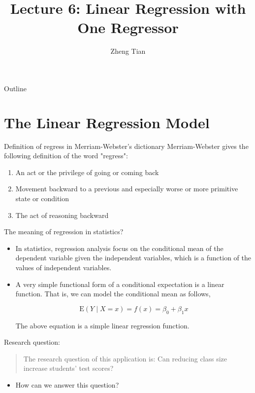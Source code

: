 \documentclass[presentation]{beamer}
\author{Zheng Tian}
\date{}
\title{Lecture 6: Linear Regression with One Regressor}
\begin{document}
\maketitle
\begin{frame}{Outline}
\setcounter{tocdepth}{1}
\tableofcontents
\end{frame}


\section{The Linear Regression Model}
\label{sec:org80d75fe}

\begin{frame}[label={sec:org3532a4e}]{Definition of \alert{regress} in Merriam-Webster's dictionary}
Merriam-Webster gives the following definition of the word "regress":
\begin{enumerate}
\item An act or the privilege of going or coming back
\item Movement backward to a previous and especially worse or more
primitive state or condition
\item The act of reasoning backward
\end{enumerate}
\end{frame}

\begin{frame}[label={sec:org1b079e3}]{The meaning of regression in statistics?}
\begin{itemize}
\item In statistics, regression analysis focus on the conditional mean of the
dependent variable given the independent variables, which is a
function of the values of independent variables.

\item A very simple functional form of a conditional expectation is a linear
function. That is, we can model the conditional mean as follows,

\begin{equation}
\label{eq:genpopreg}
\mathrm{E}(Y \mid X = x) = f(x) = \beta_{0} + \beta_1 x
\end{equation}

The above equation is a \alert{simple linear regression function}.
\end{itemize}
\end{frame}

\begin{frame}[label={sec:org79efb0f}]{Research question:}
\begin{quote}
The research question of this application is: Can reducing class size
increase students' test scores?
\end{quote}

\begin{itemize}
\item How can we answer this question?
\end{itemize}
\end{frame}
\end{document}
